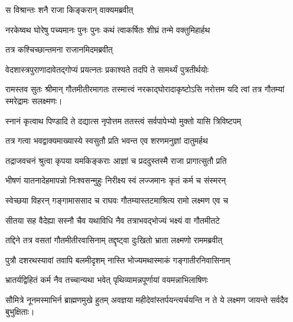 \onelineshloka
{स विश्रान्तः शनै राजा किङ्करान् वाक्यमब्रवीत्}%



\twolineshloka
{नरकेष्वथ घोरेषु पच्यमानः पुनः पुनः}
{कथं त्वाकर्षितः शीघ्रं तन्मे वक्तुमिहार्हथ} %



\onelineshloka
{तत्र कश्चिच्छान्तमना राजानमिदमब्रवीत्}%



\twolineshloka
{वेदशास्त्रपुराणादावेतद्गोप्यं प्रयत्नतः}
{प्रकाश्यते तदपि ते सामर्थ्यं पुत्रतीर्थयोः} %

\twolineshloka
{रामस्तव सुतः श्रीमान् गौतमीतीरमागतः}
{तस्मात्त्वं नरकाद्घोरादाकृष्टोऽसि नरोत्तम} %
यदि त्वां तत्र गौतम्यां स्मरेद्रामः सलक्ष्मणः।

\twolineshloka
{स्नानं कृत्वाथ पिण्डादि ते दद्यात्स नृपोत्तम}
{ततस्त्वं सर्वपापेभ्यो मुक्तो यासि त्रिविष्टपम्} %



\twolineshloka
{तत्र गत्वा भवद्वाक्यमाख्यास्ये स्वसुतौ प्रति}
{भवन्त एव शरणमनुज्ञां दातुमर्हथ} %



\twolineshloka
{तद्राजवचनं श्रुत्वा कृपया यमकिङ्कराः}
{आज्ञां च प्रददुस्तस्मै राजा प्रागात्सुतौ प्रति} %

\twolineshloka
{भीषणं यातनादेहमापन्नो निःश्वसन्मुहुः}
{निरीक्ष्य स्वं लज्जमानः कृतं कर्म च संस्मरन्} %

\twolineshloka
{स्वेच्छया विहरन् गङ्गामाससाद च राघवः}
{गौतम्यास्तटमाश्रित्य रामो लक्ष्मण एव च} %

\twolineshloka
{सीतया सह वैदेह्या सस्नौ चैव यथाविधि}
{नैव तत्राभवद्भोज्यं भक्ष्यं वा गौतमीतटे} %

\twolineshloka
{तद्दिने तत्र वसतां गौतमीतीरवासिनाम्}
{तद्दृष्ट्वा दुःखितो भ्राता लक्ष्मणो राममब्रवीत्} %



\twolineshloka
{पुत्रौ दशरथस्यावां तवापि बलमीदृशम्}
{नास्ति भोज्यमथास्माकं गङ्गातीरनिवासिनाम्} %



\twolineshloka
{भ्रातर्यद्विहितं कर्म नैव तच्चान्यथा भवेत्}
{पृथिव्यामन्नपूर्णायां वयमन्नाभिलाषिणः} %

\twolineshloka
{सौमित्रे नूनमस्माभिर्न ब्राह्मणमुखे हुतम्}
{अवज्ञया महीदेवांस्तर्पयन्त्यर्चयन्ति न} %
ते ये लक्ष्मण जायन्ते सर्वदैव बुभुक्षिताः।

